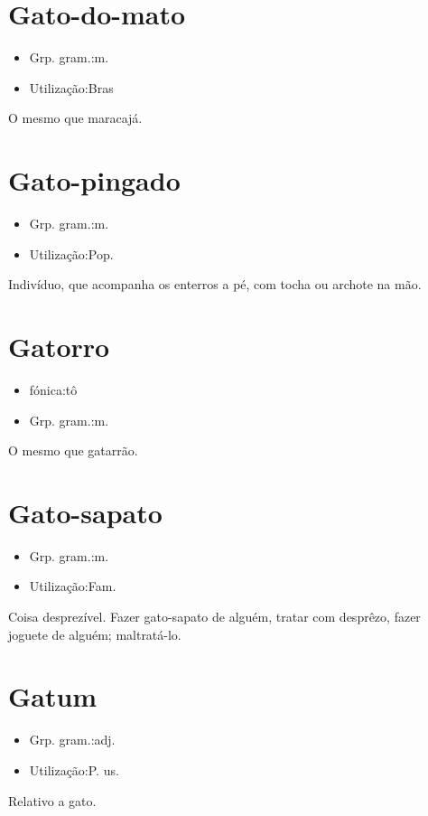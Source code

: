 \section{Gato-do-mato}
\begin{itemize}
\item {Grp. gram.:m.}
\end{itemize}
\begin{itemize}
\item {Utilização:Bras}
\end{itemize}
O mesmo que \textunderscore maracajá\textunderscore .
\section{Gato-pingado}
\begin{itemize}
\item {Grp. gram.:m.}
\end{itemize}
\begin{itemize}
\item {Utilização:Pop.}
\end{itemize}
Indivíduo, que acompanha os enterros a pé, com tocha ou archote na mão.
\section{Gatorro}
\begin{itemize}
\item {fónica:tô}
\end{itemize}
\begin{itemize}
\item {Grp. gram.:m.}
\end{itemize}
O mesmo que \textunderscore gatarrão\textunderscore .
\section{Gato-sapato}
\begin{itemize}
\item {Grp. gram.:m.}
\end{itemize}
\begin{itemize}
\item {Utilização:Fam.}
\end{itemize}
Coisa desprezível.
\textunderscore Fazer gato-sapato de alguém\textunderscore , tratar com desprêzo, fazer joguete de alguém; maltratá-lo.
\section{Gatum}
\begin{itemize}
\item {Grp. gram.:adj.}
\end{itemize}
\begin{itemize}
\item {Utilização:P. us.}
\end{itemize}
Relativo a gato.
